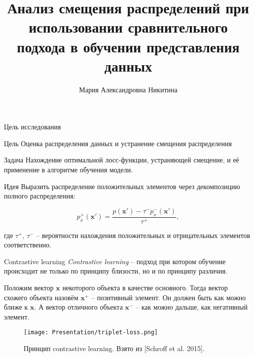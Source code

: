 \documentclass{beamer}
\title[\hbox to 56mm{Анализ смещения распределений}]{ Анализ смещения распределений при использовании сравнительного подхода в обучении представления данных}
\author[М.\,А. Никитина]{Мария Александровна Никитина}
\institute{Московский физико-технический институт}
\date{\footnotesize
\par\smallskip\emph{Кафедра:} Интеллектуальный анализ данных
\par\smallskip\emph{Научный руководитель:} кандидат ф.-м. наук Р.\,В.~Исаченко
\par\bigskip\small 2023}
\begin{document}
\begin{frame}
\thispagestyle{empty}
\maketitle
\end{frame}
\begin{frame}{Цель исследования}
\begin{block}{Цель}
Оценка распределения данных и устранение смещения распределения
\end{block}
\begin{block}{Задача}
Нахождение оптимальной лосс-функции, устраняющей смещение, и её применение в алгоритме обучения модели.
\end{block}
\begin{block}{Идея}
Выразить распределение положительных элементов через декомпозицию полного распределения:

\[p_x^+ (\textbf{x}') = \frac{p(\textbf{x}') - \tau^- p^-_x(\textbf{x}')}{\tau^+},\]

где $\tau^+$, $\tau^-$ -- вероятности нахождения положительных и отрицательных элементов соответственно.
\end{block}
\end{frame}
\begin{frame}{Contrastive learning}
\textit{Contrastive learning} – подход при котором обучение происходит не только по принципу близости, но и по принципу различия.

\bigskip

Положим вектор $\textbf{x}$ некоторого объекта в качестве основного. Тогда вектор схожего объекта назовём $\textbf{x}^+$ -- позитивный элемент. Он должен быть как можно ближе к $\textbf{x}$. А вектор отличного объекта $\textbf{x}^-$ -- как можно дальше, как негативный элемент.
\begin{figure}
\texttt{[image: Presentation/triplet-loss.png]}
\caption{Принцип contrastive learning. Взято из [Schroff et al. 2015].}
\end{figure}
\end{frame}
\end{document}
